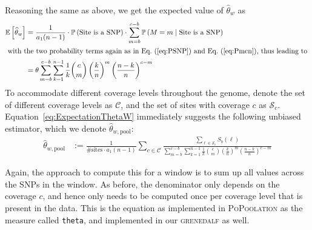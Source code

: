 \documentclass[letterpaper,fontsize=9pt,DIV=12]{scrartcl}
\newcommand\toolname{\textsc}
\newcommand\eqnref[1]{Eq.~(\ref{#1})}
\newcommand{\samplesize}{n}
\newcommand{\coverage}{c}
\begin{document}
Reasoning the same as above, we get the expected value of $\widehat{\theta}_w$ as
%
\begin{align}
    \nonumber
    \mathbb{E}\left[\widehat{\theta}_w\right]
    &= \frac{1}{a_1(\samplesize-1)} \cdot \mathbb{P}\left(\text{Site is a SNP}\right)
        \cdot \sum_{m=b}^{\coverage-b} \mathbb{P}\left(M = m \mid \text{Site is a SNP}\right)
    \\
    \intertext{
        with the two probability terms again as in \eqnref{eq:PSNP} and \eqnref{eq:Pmcn}, thus leading to
    }
    \label{eq:ExpectationThetaW}
    &= \theta\sum_{m=b}^{\coverage-b}\sum_{k=1}^{n-1} \frac{1}{k} \binom{\coverage}{m} \left(\frac{k}{\samplesize}\right)^m \left(\frac{\samplesize-k}{\samplesize}\right)^{\coverage-m}
\end{align}
%
To accommodate different coverage levels throughout the genome, denote the set of different coverage levels as $\mathcal{C}$, and the set of sites with coverage $c$ as $\mathcal{S}_c$. Equation~\ref{eq:ExpectationThetaW} immediately suggests the following unbiased estimator, which we denote $\widehat{\theta}_{w, \text{pool}}$:
%
\begin{align}
    \label{eq:CorrectedThetaEstimate}
    \widehat{\theta}_{w, \text{pool}} &:= \frac{1}{\text{\# sites} \cdot a_1(n-1)}\sum_{c \in \mathcal{C}}
    \frac{
        \sum_{\ell \in \mathcal{S}_c} S_b(\ell)
    }{
         \sum_{m=b}^{\coverage-b}\sum_{k=1}^{n-1} \frac{1}{k} \binom{\coverage}{m} \left(\frac{k}{\samplesize}\right)^m \left(\frac{\samplesize-k}{\samplesize}\right)^{\coverage-m}
    }
\end{align}

Again, the approach to compute this for a window is to sum up all values across the SNPs in the window.  As before, the denominator only depends on the coverage $\coverage$, and hence only needs to be computed once per coverage level that is present in the data.  This is the equation as implemented in \toolname{PoPoolation} as the measure called \texttt{theta}, and implemented in our \toolname{grenedalf} as well.


\end{document}
